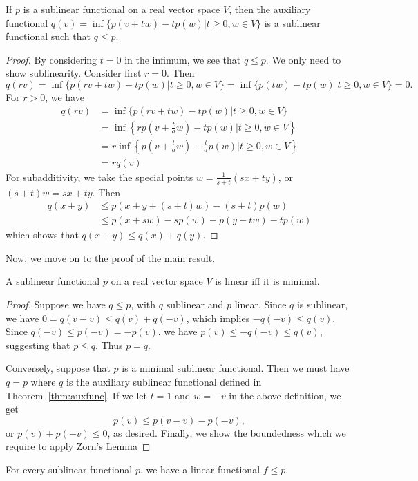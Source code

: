 \documentclass[twoside,symmetric, openany, 12pt]{./tuftebook}
\theoremstyle{definition}
\theoremstyle{definition}
\theoremstyle{definition}
\begin{document}
\begin{Theorem}\label{thm:auxfunc}
	If $p$ is a sublinear functional on a real vector space $V$, then the auxiliary functional $q(v)=\inf \{p(v+tw)-tp(w)|t\ge 0,w\in V\} $ is a sublinear functional such that $q \le p$.
\end{Theorem}
\begin{proof}
	By considering $t=0$ in the infimum, we see that $q\le p$. We only need to show sublinearity. Consider first $r=0$. Then
	\[
	q(rv)=\inf \{p(rv+tw)-tp(w)|t\ge 0,w\in V\} =\inf \{p(tw)-tp(w)|t\ge 0, w\in V\} =0
	.\] 
	For $r>0$, we have
	\begin{align*}
		q(rv)&=\inf \{p(rv+tw)-tp(w)|t \ge 0, w\in V\} \\
		     &=\inf \left\{ rp\left( v+\frac{t}{a}w \right)-tp(w)|t\ge 0, w\in V \right\} \\
		     &=r\inf \left\{p\left(v+\frac ta w\right) -\frac ta p(w)|t\ge 0, w\in V\right\} \\
		     &=rq(v)
	\end{align*}
	For subadditivity, we take the special points $w=\frac{1}{s+t}(sx+ty)$, or $(s+t)w=sx+ty$. Then
	\begin{align*}
		q(x+y)&\le p(x+y+(s+t)w)-(s+t)p(w)\\
		      &\le p(x+sw)-sp(w)+p(y+tw)-tp(w)
	\end{align*}
	which shows that $q(x+y)\le q(x)+q(y)$.
\end{proof}
Now, we move on to the proof of the main result.
\begin{Theorem}
	A sublinear functional $p$ on a real vector space $V$ is linear iff it is minimal.
\end{Theorem}
\begin{proof}
	Suppose we have $q\le p$, with $q$ sublinear and $p$ linear. Since $q$ is sublinear, we have $0=q(v-v)\le q(v)+q(-v)$, which implies $-q(-v)\le q(v)$. Since $q(-v) \le p(-v)=-p(v)$, we have $p(v)\le -q(-v)\le q(v)$, suggesting that $p\le q$. Thus $p=q$.

	Conversely, suppose that $p$ is a minimal sublinear functional. Then we must have $q=p$ where $q$ is the auxiliary sublinear functional defined in Theorem~\ref{thm:auxfunc}. If we let $t=1$ and $w=-v$ in the above definition, we get
	\[
	p(v)\le p(v-v)-p(-v)
,\]
or $p(v)+p(-v)\le 0$, as desired. Finally, we show the boundedness which we require to apply Zorn's Lemma
\end{proof}
\begin{Theorem}
	For every sublinear functional $p$, we have a linear functional $f\le p$. 
\end{Theorem}
\end{document}
